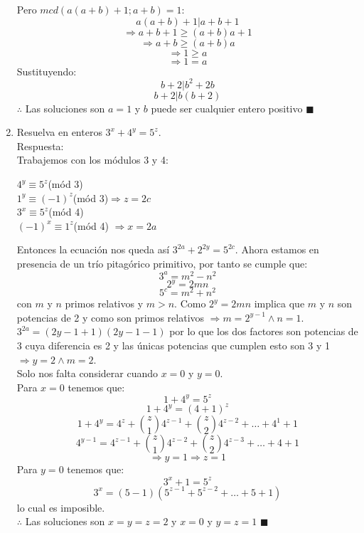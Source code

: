 \documentclass{book}
\begin{document}
\begin{enumerate}
          Pero $mcd(a(a + b) + 1;a + b) = 1$:
          $$a(a + b) + 1| a + b + 1 $$
          $$\Rightarrow a + b + 1 \geq (a + b)a + 1$$
          $$\Rightarrow a + b \geq (a + b)a$$
          $$\Rightarrow 1 \geq a$$
          $$\Rightarrow 1 = a $$
          Sustituyendo:
          $$b + 2| b^2 + 2b$$
          $$ b + 2 |b(b + 2)$$
          $\therefore$ Las soluciones son $a = 1$ y $b$ puede ser cualquier entero positivo $\blacksquare$\\
    \item Resuelva en enteros $3^x+4^y=5^z$.\\
          Respuesta:\\
          Trabajemos con los módulos 3 y 4:
          \begin{center}
              $4^y \equiv 5^z$(mód 3) \\
              $1^y \equiv (-1)^z$(mód 3)$ \Rightarrow z= 2c$\\
              $ 3^x \equiv 5^z$(mód 4)\\
              $ (-1)^x \equiv 1^z$(mód 4) $\Rightarrow x= 2a$\\
          \end{center}
          Entonces la ecuación nos queda así $3^{2a} + 2^{2y} = 5^{2c} $. Ahora estamos en presencia de un trío pitagórico primitivo, por tanto se cumple que:
          $$3^a = m^2 - n^2$$
          $$2^y = 2mn$$
          $$5^c = m^2 + n^2$$
          con $m$ y $n$ primos relativos y $m > n$.
          Como $2^y = 2mn$ implica que $m$ y $n$ son potencias de 2 y como son primos relativos $\Rightarrow m= 2^{y-1} \wedge n= 1$. \\
          $3^{2a} = (2y-1 + 1)(2y-1 - 1)$ por lo que los dos factores son potencias de 3 cuya diferencia es 2 y las únicas potencias que cumplen esto son 3 y 1 $\Rightarrow y= 2\wedge m= 2$.\\
          Solo nos falta considerar cuando $x=0$ y $y=0$.\\
          Para $x=0$ tenemos que:
          $$1+4^y=5^z$$
          $$1+4^y={(4+1)}^z$$
          $$1+4^y=4^z+{z\choose 1}4^{z-1}+ {z\choose 2}4^{z-2}+\ldots+4^1+1$$
          $$4^{y-1}=4^{z-1}+{z\choose 1}4^{z-2}+ {z\choose 2}4^{z-3}+\ldots+4+1$$
          $$\Rightarrow y=1\Rightarrow z=1$$
          Para $y=0$ tenemos que:
          $$3^x+1=5^z$$
          $$3^x=(5-1)(5^{z-1}+5^{z-2}+\ldots+5+1)$$
          lo cual es imposible.\\
          $\therefore$ Las soluciones son $x=y=z=2$ y $x=0$ y $y=z= 1$ $\blacksquare$ \\

\end{enumerate}
\end{document}
